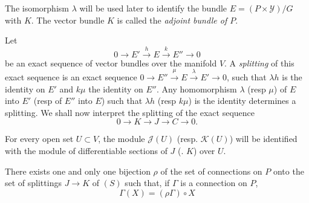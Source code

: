 The isomorphism $\lambda$ will be used later to identify the bundle $E
= (P \times \mathscr{Y})/G$ with $K$. The vector bundle $K$ is called
the \textit{adjoint bundle of $P$}. 

\begin{defn}\label{chap5:sec5:def3}%
  Let\pageoriginale
  $$
  0 \to E' \xrightarrow{h} E \xrightarrow{k} E'' \to 0
  $$
  be an exact sequence of vector bundles over the manifold $V$. A {\em
    splitting} of this exact sequence is an exact sequence $0 \to E''
  \xrightarrow{\mu} E \xrightarrow{\lambda}E' \to 0$, such that
  $\lambda h$ is the identity on $E'$ and $k \mu$ the identity on
  $E''$. Any homomorphism $\lambda$ (resp $\mu$) of $E$ into $E'$
  (resp of $E''$ into $E$) such that $\lambda h$ (resp $k \mu$) is the
  identity determines a splitting. We shall now interpret the splitting
  of the exact sequence 
  \begin{equation}
    0 \to K \to J \to C \to 0. \tag{S}
  \end{equation}
\end{defn}

For every open set $U \subset V$, the module $\mathcal{J}(U)$
(resp. $\mathscr{K} (U)$) will be identified with the module of
differentiable sections of $J$ (\resp. $K$) over $U$. 

\begin{theorem}\label{chap5:sec5:thm2}%
  There exists one and only one bijection $\rho$ of the set of
  connections on $P$ onto the set of splittings $J \to K$ of $(S)$
  such that, if $\Gamma$ is a connection on $P$, 
  $$
  \Gamma (X)=  (\rho \Gamma) \circ  X
  $$
\end{theorem}

